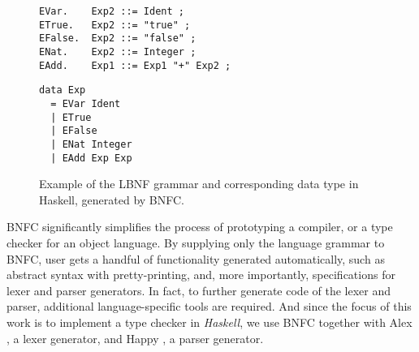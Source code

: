 \begin{figure}[H]
  \centering
  \begin{minipage}{0.49\textwidth}
    \begin{verbatim}
EVar.    Exp2 ::= Ident ;
ETrue.   Exp2 ::= "true" ;
EFalse.  Exp2 ::= "false" ;
ENat.    Exp2 ::= Integer ;
EAdd.    Exp1 ::= Exp1 "+" Exp2 ;
    \end{verbatim}
    \hfill
  \end{minipage}
  \begin{minipage}{0.49\textwidth}
    \begin{verbatim}
data Exp
  = EVar Ident
  | ETrue 
  | EFalse
  | ENat Integer
  | EAdd Exp Exp
    \end{verbatim}
  \end{minipage}
  \caption[Input grammar and code produced by BNFC]{Example of the LBNF grammar and corresponding data type in Haskell, generated by BNFC.}
  \label{fig:lbnf-bnfc-example}
\end{figure}

BNFC significantly simplifies the process of prototyping a compiler, or a type checker for an object language. By supplying only the language grammar to BNFC, user gets a handful of functionality generated automatically, such as abstract syntax with pretty-printing, and, more importantly, specifications for lexer and parser generators. In fact, to further generate code of the lexer and parser, additional language-specific tools are required. And since the focus of this work is to implement a type checker in \textit{Haskell}, we use BNFC together with Alex \cite{haskell_alex}, a lexer generator, and Happy \cite{haskell_happy}, a parser generator.
